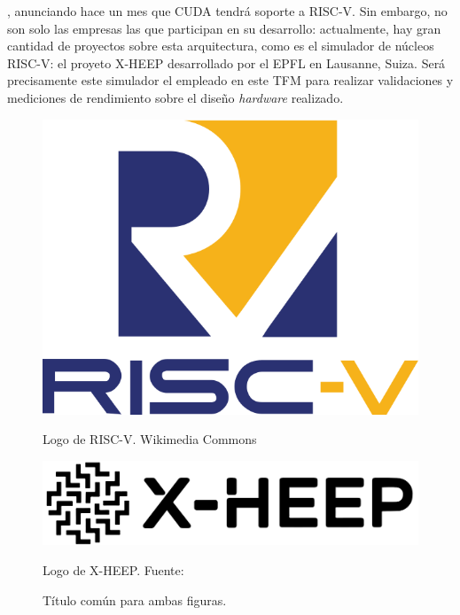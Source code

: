 \cite{nvidiaRISCV}, anunciando hace un mes que CUDA tendrá soporte a RISC-V. Sin embargo, no son solo las empresas las que participan en su desarrollo: actualmente, hay gran cantidad de proyectos sobre esta arquitectura, como es el simulador de núcleos RISC-V: el proyeto \ac{X-HEEP} \cite{machetti2024xheep} desarrollado por el \ac{EPFL} en Lausanne, Suiza. Será precisamente este simulador el empleado en este \ac{TFM} para realizar validaciones y mediciones de rendimiento sobre el diseño \textit{hardware} realizado.


\begin{figure}[!ht]
    \centering
    \begin{minipage}{0.45\textwidth}
        \centering
        \includegraphics[width=\textwidth]{figures/RISC-V-logo-square.svg.png}
        \caption{Logo de RISC-V. Wikimedia Commons}
        \label{fig:logoRISCV}
    \end{minipage}\hfill
    \begin{minipage}{0.45\textwidth}
        \centering
        \includegraphics[width=\textwidth]{figures/x-heep-outline.png}
        \caption{Logo de X-HEEP. Fuente: \cite{xheepLogo}}
        \label{fig:imagen2}
    \end{minipage}
    \caption{Título común para ambas figuras.}
    \label{fig:dosimagenes}
\end{figure}


